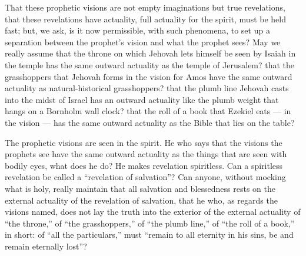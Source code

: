 \documentclass[12pt]{book}
\newcommand{\opage}[1]{\marginnote{\footnotesize\textit{[#1]}}}
\begin{document}
That these prophetic visions are not empty imaginations but true
revelations, that these revelations have actuality, full actuality for
the spirit, must be held fast; but, we ask, is it now permissible, with
such phenomena, to set up a separation between the prophet's vision and
what the prophet sees? May we really assume that the throne on which
Jehovah lets himself be seen by Isaiah in the temple has the same
outward actuality as the temple of Jerusalem? that the grasshoppers that
Jehovah forms in the vision for Amos have the same outward actuality as
natural-historical grasshoppers? that the plumb line Jehovah casts into
the midst of Israel has an outward actuality like the plumb weight that
hangs on a Bornholm wall clock? that the roll of a book that Ezekiel eats
--- in the vision --- has the same outward actuality as the Bible that
lies on the table?

The prophetic visions are seen in the spirit. He who says that the
visions the prophets see have the same outward actuality as the things
that are seen with bodily eyes, what does he
\opage{301}\setcounter{footnote}{0}%
do? He makes revelation spiritless. Can a spiritless revelation be called
a ``revelation of salvation''? Can anyone, without mocking what is holy,
really maintain that all salvation and blessedness rests on the external
actuality of the revelation of salvation, that he who, as regards the
visions named, does not lay the truth into the exterior of the external
actuality of ``the throne,'' of ``the grasshoppers,'' of ``the plumb
line,'' of ``the roll of a book,'' in short: of ``all the particulars,''
must ``remain to all eternity in his sins, be and remain eternally
lost''?
\end{document}

